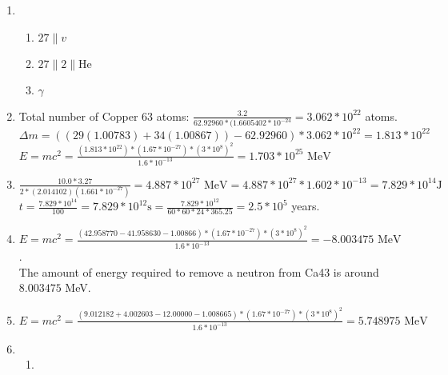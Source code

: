 \documentclass{article}
\begin{document}
\begin{enumerate}
\begin{enumerate}
    \end{enumerate}
    
    \item
    
    \begin{enumerate}
        \item 
        
        $27 \| v$
        
        \item
        
        $27 \| 2 \| \text{He}$
        
        \item
        
        $\gamma$
        
    \end{enumerate}
    
    \item
    
    Total number of Copper 63 atoms: $\frac{3.2}{62.92960*(1.6605402*10^{-24}} = 3.062*10^{22}$ atoms.\\
    $\Delta m = ((29(1.00783)+34(1.00867))-62.92960)*3.062*10^{22} = 1.813*10^{22}$\\
    $E=mc^2 = \frac{(1.813*10^{22})*(1.67*10^{-27})*(3*10^8)^2}{1.6*10^{-13}} = 1.703*10^{25} \text{ MeV}$
    
    \item
    
    $\frac{10.0*3.27}{2*(2.014102)(1.661*10^{-27})} = 4.887*10^{27}\text{ MeV} = 4.887*10^{27}*1.602*10^{-13} = 7.829*10^{14}\text{J}$\\
    $t = \frac{7.829*10^{14}}{100} = 7.829*10^{12}\text{s} = \frac{7.829*10^{12}}{60*60*24*365.25} = 2.5*10^5$ years.
    
    \item
    
    $E = mc^2 = \frac{(42.958770-41.958630-1.00866)*(1.67*10^{-27})*(3*10^8)^2}{1.6*10^{-13}} = -8.003475\text{ MeV}$.\\
    The amount of energy required to remove a neutron from Ca43 is around $8.003475$ MeV.
    
    \item
    
    $E=mc^2 = \frac{(9.012182+4.002603-12.00000-1.008665)*(1.67*10^{-27})*(3*10^8)^2}{1.6*10^{-13}} = 5.748975\text{ MeV}$
    
    \item
    
    \begin{enumerate}
        \item 
        

\end{enumerate}
\end{enumerate}
\end{document}
